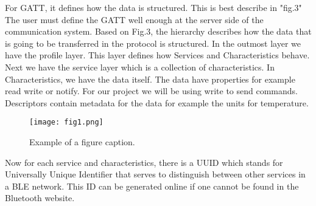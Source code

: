 For GATT, it defines how the data is structured. This is best describe in "fig.3" The user must define the GATT well enough at the server side of the communication system. Based on Fig.3, the hierarchy describes how the data that is going to be transferred in the protocol is structured. In the outmost layer we have the profile layer. This layer defines how Services and Characteristics behave. Next we have the service layer which is a collection of characteristics. In Characteristics, we have the data itself. The data have properties for example read write or notify. For our project we will be using write to send commands. Descriptors contain metadata for the data for example the units for temperature.

\begin{figure}[htbp]
\centerline{\texttt{[image: fig1.png]}}
\caption{Example of a figure caption.}
\label{fig}
\end{figure}

Now for each service and characteristics, there is a UUID which stands for Universally Unique Identifier that serves to distinguish between other services in a BLE network. This ID can be generated online if one cannot be found in the Bluetooth website.

